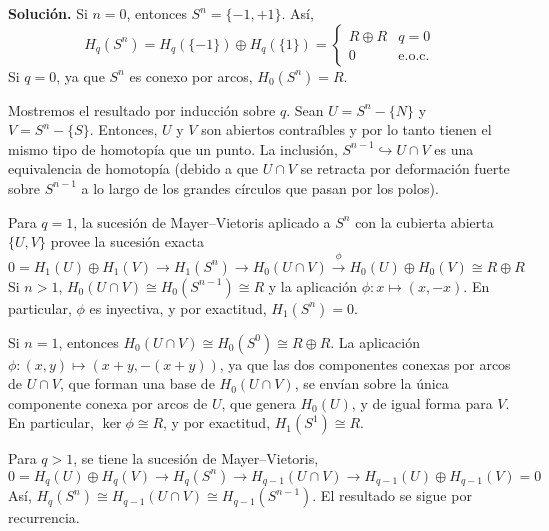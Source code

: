 \documentclass[11pt,a4paper]{article}
\theoremstyle{plain}
\theoremstyle{definition}
\theoremstyle{remark}
\begin{document}
\begin{enumerate}[label=\arabic*.,leftmargin=*]
\noindent\textbf{Solución.} Si $n=0$, entonces $S^n=\{-1,+1\}$. Así,
\[
H_q(S^n)=H_q(\{-1\})\oplus H_q(\{1\})=\begin{cases}R\oplus R & q=0\\0 & \text{e.o.c.}\end{cases}
\]
Si $q=0$, ya que $S^n$ es conexo por arcos, $H_0(S^n)=R$.

Mostremos el resultado por inducción sobre $q$. Sean $U=S^n-\{N\}$ y
$V=S^n-\{S\}$. Entonces, $U$ y $V$ son abiertos contraíbles y por lo tanto
tienen el mismo tipo de homotopía que un punto. La inclusión,
$S^{n-1}\hookrightarrow U\cap V$ es una equivalencia de homotopía (debido a
que $U\cap V$ se retracta por deformación fuerte sobre $S^{n-1}$ a lo largo
de los grandes círculos que pasan por los polos).

Para $q=1$, la sucesión de Mayer--Vietoris aplicado a $S^n$ con la cubierta
abierta $\{U,V\}$ provee la sucesión exacta
\[
0=H_1(U)\oplus H_1(V)\to H_1(S^n)\to H_0(U\cap V)\xrightarrow{\phi}H_0(U)\oplus H_0(V)\cong R\oplus R
\]
Si $n>1$, $H_0(U\cap V)\cong H_0(S^{n-1})\cong R$ y la aplicación
$\phi:x\mapsto(x,-x)$. En particular, $\phi$ es inyectiva, y por
exactitud, $H_1(S^n)=0$.

Si $n=1$, entonces $H_0(U\cap V)\cong H_0(S^0)\cong R\oplus R$. La
aplicación $\phi:(x,y)\mapsto(x+y,-(x+y))$, ya que las dos componentes
conexas por arcos de $U\cap V$, que forman una base de $H_0(U\cap V)$, se
envían sobre la única componente conexa por arcos de $U$, que genera
$H_0(U)$, y de igual forma para $V$. En particular, $\ker\phi\cong R$, y
por exactitud, $H_1(S^1)\cong R$.

Para $q>1$, se tiene la sucesión de Mayer--Vietoris,
\[
0=H_q(U)\oplus H_q(V)\to H_q(S^n)\to H_{q-1}(U\cap V)\to H_{q-1}(U)\oplus H_{q-1}(V)=0
\]
Así, $H_q(S^n)\cong H_{q-1}(U\cap V)\cong H_{q-1}(S^{n-1})$. El resultado se
sigue por recurrencia.


\end{enumerate}
\end{document}
